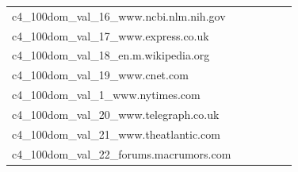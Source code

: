 \documentclass[dvipsnames]{article}
\begin{document}
\begin{appendix}
{\begin{longtable}{m{6cm}m{1.7cm}m{1.7cm}m{1.7cm}m{1.7cm}m{1.7cm}}
	c4\_100dom\_val\_16\_www.ncbi.nlm.nih.gov  & \colorbox[HTML]{fbfdd3}{\makebox[\mywidth][c]{7.39}} & \colorbox[HTML]{f8fcc1}{\makebox[\mywidth][c]{7.31}} & \colorbox[HTML]{ffffe5}{\makebox[\mywidth][c]{7.98}} & \colorbox[HTML]{aadc8d}{\makebox[\mywidth][c]{7.11}} & \colorbox[HTML]{77c578}{\makebox[\mywidth][c]{7.07}}\\
	c4\_100dom\_val\_17\_www.express.co.uk  & \colorbox[HTML]{ffffe5}{\makebox[\mywidth][c]{11.57}} & \colorbox[HTML]{f5fbb8}{\makebox[\mywidth][c]{11.04}} & \colorbox[HTML]{ffffe5}{\makebox[\mywidth][c]{11.84}} & \colorbox[HTML]{eaf7af}{\makebox[\mywidth][c]{10.99}} & \colorbox[HTML]{77c578}{\makebox[\mywidth][c]{10.79}}\\
	c4\_100dom\_val\_18\_en.m.wikipedia.org  & \colorbox[HTML]{ffffe5}{\makebox[\mywidth][c]{9.28}} & \colorbox[HTML]{f1f9b4}{\makebox[\mywidth][c]{8.95}} & \colorbox[HTML]{ffffe5}{\makebox[\mywidth][c]{9.52}} & \colorbox[HTML]{d8efa2}{\makebox[\mywidth][c]{8.89}} & \colorbox[HTML]{77c578}{\makebox[\mywidth][c]{8.80}}\\
	c4\_100dom\_val\_19\_www.cnet.com  & \colorbox[HTML]{fefee2}{\makebox[\mywidth][c]{12.61}} & \colorbox[HTML]{f3fab6}{\makebox[\mywidth][c]{12.23}} & \colorbox[HTML]{ffffe5}{\makebox[\mywidth][c]{13.12}} & \colorbox[HTML]{c9e99b}{\makebox[\mywidth][c]{12.09}} & \colorbox[HTML]{77c578}{\makebox[\mywidth][c]{11.97}}\\
	c4\_100dom\_val\_1\_www.nytimes.com  & \colorbox[HTML]{fdfedb}{\makebox[\mywidth][c]{13.13}} & \colorbox[HTML]{dcf1a5}{\makebox[\mywidth][c]{12.66}} & \colorbox[HTML]{ffffe5}{\makebox[\mywidth][c]{14.04}} & \colorbox[HTML]{e0f2a8}{\makebox[\mywidth][c]{12.68}} & \colorbox[HTML]{77c578}{\makebox[\mywidth][c]{12.44}}\\
	c4\_100dom\_val\_20\_www.telegraph.co.uk  & \colorbox[HTML]{fefee3}{\makebox[\mywidth][c]{13.71}} & \colorbox[HTML]{e3f4aa}{\makebox[\mywidth][c]{13.10}} & \colorbox[HTML]{ffffe5}{\makebox[\mywidth][c]{14.28}} & \colorbox[HTML]{daf0a4}{\makebox[\mywidth][c]{13.06}} & \colorbox[HTML]{77c578}{\makebox[\mywidth][c]{12.88}}\\
	c4\_100dom\_val\_21\_www.theatlantic.com  & \colorbox[HTML]{fdfede}{\makebox[\mywidth][c]{14.70}} & \colorbox[HTML]{daf0a4}{\makebox[\mywidth][c]{14.17}} & \colorbox[HTML]{ffffe5}{\makebox[\mywidth][c]{15.54}} & \colorbox[HTML]{d8efa2}{\makebox[\mywidth][c]{14.17}} & \colorbox[HTML]{77c578}{\makebox[\mywidth][c]{13.97}}\\
	c4\_100dom\_val\_22\_forums.macrumors.com  & \colorbox[HTML]{fbfdd4}{\makebox[\mywidth][c]{17.77}} & \colorbox[HTML]{e7f5ad}{\makebox[\mywidth][c]{17.34}} & \colorbox[HTML]{ffffe5}{\makebox[\mywidth][c]{19.15}} & \colorbox[HTML]{d5eea1}{\makebox[\mywidth][c]{17.22}} & \colorbox[HTML]{77c578}{\makebox[\mywidth][c]{16.95}}\\

\end{longtable}}
\end{appendix}
\end{document}
